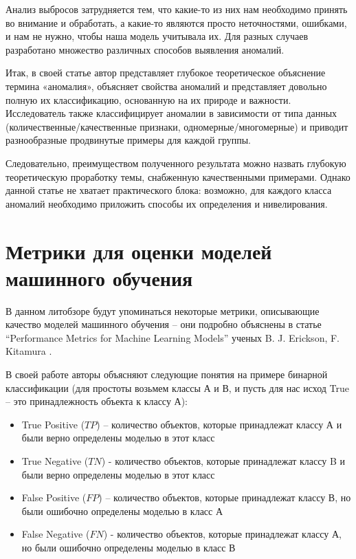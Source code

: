 \documentclass[14pt, letterpaper]{extarticle}
\begin{document}
Анализ выбросов затрудняется тем, что какие-то из них нам необходимо принять во внимание и обработать, а какие-то являются просто неточностями, ошибками, и нам не нужно, чтобы наша модель учитывала их. Для разных случаев разработано множество различных способов выявления аномалий. 

Итак, в своей статье автор представляет глубокое теоретическое объяснение термина «аномалия», объясняет свойства аномалий и представляет довольно полную их классификацию, основанную на их природе и важности. Исследователь также классифицирует аномалии в зависимости от типа данных (количественные/качественные признаки, одномерные/многомерные) и приводит разнообразные продвинутые примеры для каждой группы.

Следовательно, преимуществом полученного результата можно назвать глубокую теоретическую проработку темы, снабженную качественными примерами. Однако данной статье не хватает практического блока: возможно, для каждого класса аномалий необходимо приложить способы их определения и нивелирования.

\section{Метрики для оценки моделей машинного обучения}
В данном литобзоре будут упоминаться некоторые метрики, описывающие качество моделей машинного обучения – они подробно объяснены в статье “Performance Metrics for Machine Learning Models” ученых B. J. Erickson, F. Kitamura \cite{erickson2021performance}. 

В своей работе авторы объясняют следующие понятия на примере бинарной классификации (для простоты возьмем классы А и В, и пусть для нас исход True – это принадлежность объекта к классу А):
\begin{itemize} 
    \item True Positive ($TP$) – количество объектов, которые принадлежат классу А и были верно определены моделью в этот класс 
    \item True Negative ($TN$) - количество объектов, которые принадлежат классу B и были верно определены моделью в этот класс 
    \item False Positive ($FP$) – количество объектов, которые принадлежат классу В, но были ошибочно определены моделью в класс А
    \item False Negative ($FN$) - количество объектов, которые принадлежат классу А, но были ошибочно определены моделью в класс В
\end{itemize}
\end{document}
